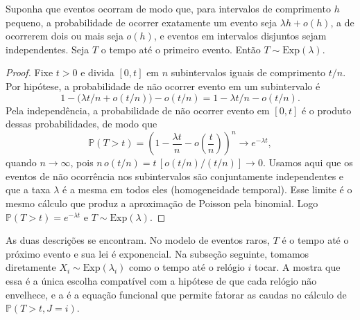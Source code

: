 \begin{proposition}\label{prop:tempo-primeiro-evento}
Suponha que eventos ocorram de modo que, para intervalos de comprimento $h$
pequeno, a probabilidade de ocorrer exatamente um evento seja
$\lambda h+o(h)$, a de ocorrerem dois ou mais seja $o(h)$, e eventos em
intervalos disjuntos sejam independentes. Seja $T$ o tempo até o primeiro
evento. Então $T\sim\mathrm{Exp}(\lambda)$.
\end{proposition}
\begin{proof}
Fixe $t>0$ e divida $[0,t]$ em $n$ subintervalos iguais de comprimento
$t/n$. Por hipótese, a probabilidade de não ocorrer evento em um
subintervalo é
\[
  1-\bigl(\lambda t/n+o(t/n)\bigr)-o(t/n)=1-\lambda t/n-o(t/n).
\]
Pela independência, a probabilidade de não ocorrer evento em $[0,t]$ é o
produto dessas probabilidades, de modo que
\[
  \mathbb{P}(T>t)
  =\left(1-\frac{\lambda t}{n}-o\!\left(\frac{t}{n}\right)\right)^{n}
  \longrightarrow e^{-\lambda t},
\]
quando $n\to\infty$, pois $n\,o(t/n)=t\,[o(t/n)/(t/n)]\to 0$. Usamos aqui
que os eventos de não ocorrência nos subintervalos são conjuntamente
independentes e que a taxa $\lambda$ é a mesma em todos eles (homogeneidade
temporal). Esse limite é o mesmo cálculo que produz a aproximação de Poisson
pela binomial. Logo $\mathbb{P}(T>t)=e^{-\lambda t}$ e
$T\sim\mathrm{Exp}(\lambda)$.
\end{proof}

\begin{remark}\label{rem:ligacao-corrida}
As duas descrições se encontram. No modelo de eventos raros, $T$ é o tempo
até o próximo evento e sua lei é exponencial. Na subseção seguinte, tomamos
diretamente $X_i\sim\mathrm{Exp}(\lambda_i)$ como o tempo até o relógio $i$
tocar. A  mostra que essa é a única
escolha compatível com a hipótese de que cada relógio não envelhece, e a
 é a equação funcional que permite fatorar
as caudas no cálculo de $\mathbb{P}(T>t,J=i)$.
\end{remark}



